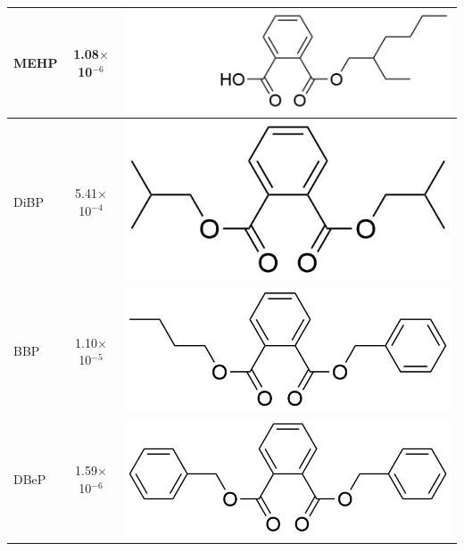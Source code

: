 {\begin{table}
\begin{tabular}{lcc}
MEHP &  1.08$\times$10$^{-6}$  &  \begin{minipage}[c]{0.35\linewidth}\centering
\includegraphics[height=0.07\textheight]{pics/PH/MEHP_struct3.png}\end{minipage}\\ \midrule
DiBP &  5.41$\times$10$^{-4}$   &  \begin{minipage}[c]{0.35\linewidth}\centering
\includegraphics[height=0.07\textheight]{pics/PH/DiBP_struct2.png}\end{minipage}\\ \midrule
BBP &   1.10$\times$10$^{-5}$  &  \begin{minipage}[c]{0.35\linewidth}\centering
\includegraphics[height=0.07\textheight]{pics/PH/BBP_struct2.png}\end{minipage}\\ \midrule
DBeP &  1.59$\times$10$^{-6}$   &  \begin{minipage}[c]{0.35\linewidth}\centering
\includegraphics[height=0.07\textheight]{pics/PH/DBeP_struct2.png}\end{minipage}\\ \midrule

\end{tabular}
\end{table}}
